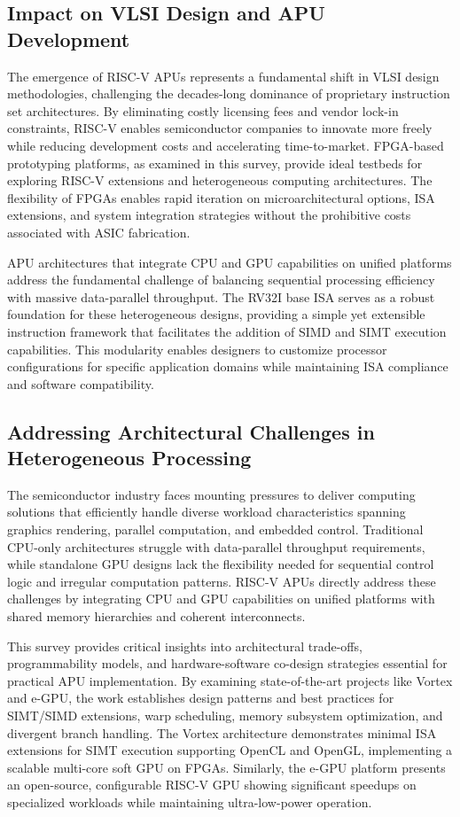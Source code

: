 \documentclass[a4paper,twoside]{article}
\begin{document}
\subsection{Impact on VLSI Design and APU Development}
The emergence of RISC-V APUs represents a fundamental shift in VLSI design methodologies, challenging the decades-long dominance of proprietary instruction set architectures. By eliminating costly licensing fees and vendor lock-in constraints, RISC-V enables semiconductor companies to innovate more freely while reducing development costs and accelerating time-to-market. FPGA-based prototyping platforms, as examined in this survey, provide ideal testbeds for exploring RISC-V extensions and heterogeneous computing architectures. The flexibility of FPGAs enables rapid iteration on microarchitectural options, ISA extensions, and system integration strategies without the prohibitive costs associated with ASIC fabrication. 

APU architectures that integrate CPU and GPU capabilities on unified platforms address the fundamental challenge of balancing sequential processing efficiency with massive data-parallel throughput. The RV32I base ISA serves as a robust foundation for these heterogeneous designs, providing a simple yet extensible instruction framework that facilitates the addition of SIMD and SIMT execution capabilities. This modularity enables designers to customize processor configurations for specific application domains while maintaining ISA compliance and software compatibility.

\subsection{Addressing Architectural Challenges in Heterogeneous Processing}
The semiconductor industry faces mounting pressures to deliver computing solutions that efficiently handle diverse workload characteristics spanning graphics rendering, parallel computation, and embedded control. Traditional CPU-only architectures struggle with data-parallel throughput requirements, while standalone GPU designs lack the flexibility needed for sequential control logic and irregular computation patterns. RISC-V APUs directly address these challenges by integrating CPU and GPU capabilities on unified platforms with shared memory hierarchies and coherent interconnects.

This survey provides critical insights into architectural trade-offs, programmability models, and hardware-software co-design strategies essential for practical APU implementation. By examining state-of-the-art projects like Vortex and e-GPU, the work establishes design patterns and best practices for SIMT/SIMD extensions, warp scheduling, memory subsystem optimization, and divergent branch handling. The Vortex architecture demonstrates minimal ISA extensions for SIMT execution supporting OpenCL and OpenGL, implementing a scalable multi-core soft GPU on FPGAs. Similarly, the e-GPU platform presents an open-source, configurable RISC-V GPU showing significant speedups on specialized workloads while maintaining ultra-low-power operation.
\end{document}
